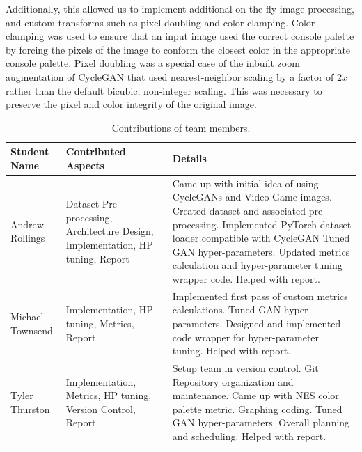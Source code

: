 \documentclass[10pt,twocolumn,letterpaper]{article}
\begin{document}
Additionally, this allowed us to implement additional on-the-fly image processing, and custom transforms such as pixel-doubling and color-clamping. Color clamping was used to ensure that an input image used the correct console palette by forcing the pixels of the image to conform the closest color in the appropriate console palette.
Pixel doubling was a special case of the inbuilt zoom augmentation of CycleGAN that used nearest-neighbor scaling by a factor of $2x$ rather than the default bicubic, non-integer scaling. This was necessary to preserve the pixel and color integrity of the original image.


\newpage
\begin{table}
   \begin{center}
      \begin{tabular}{|p{3cm}|p{5.5cm}|p{8.5cm}|}
         \hline
         \textbf{Student Name} & \textbf{Contributed Aspects}                                                   & \textbf{Details}                                                                                                                                                                                                                                                                                    \\
         \hline\hline
         Andrew Rollings       & Dataset Pre-processing, Architecture Design, Implementation, HP tuning, Report & Came up with initial idea of using CycleGANs and Video Game images. Created dataset and associated pre-processing. Implemented PyTorch dataset loader compatible with CycleGAN Tuned GAN hyper-parameters. Updated metrics calculation and hyper-parameter tuning wrapper code. Helped with report. \\
         \hline
         Michael Townsend      & Implementation, HP tuning, Metrics, Report                                     & Implemented first pass of custom metrics calculations. Tuned GAN hyper-parameters. Designed and implemented code wrapper for hyper-parameter tuning. Helped with report.                                                                                                                            \\
         \hline
         Tyler Thurston        & Implementation, Metrics, HP tuning, Version Control, Report                    & Setup team in version control. Git Repository organization and maintenance. Came up with NES color palette metric. Graphing coding. Tuned GAN hyper-parameters. Overall planning and scheduling. Helped with report.                                                                                \\
         \hline
      \end{tabular}
   \end{center}
   \caption{Contributions of team members.}
   \label{tab:contributions}
\end{table}
\end{document}
